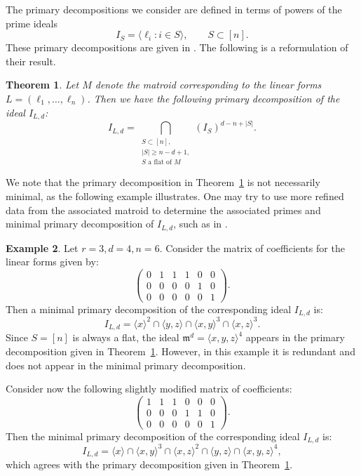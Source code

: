 \documentclass [a4paper,reqno, 11pt]{amsart}
\theoremstyle{plain}
\newtheorem{theorem}{Theorem}[section]
\theoremstyle{plain}
\theoremstyle{plain}
\theoremstyle{plain}
\theoremstyle{definition}
\theoremstyle{definition}
\newtheorem{example}[theorem]{Example}
\theoremstyle{definition}
\theoremstyle{definition}
\theoremstyle{definition}
\theoremstyle{definition}
\begin{document}
The primary decompositions we consider are defined in terms of powers of the prime ideals
\[I_S=\langle\ell_i:i\in S\rangle,\qquad S\subset[n].\]
These primary decompositions are given in \cite[Theorem 2.2]{BTX}. The following is a reformulation of their result.

\begin{theorem}\label{thm:flats-pri-decomp}
    Let $M$ denote the matroid corresponding to the linear forms $L=(\ell_1,\ldots,\ell_n)$. Then we have the following primary decomposition of the ideal $I_{L,d}$:
    \[I_{L,d}=\bigcap_{\substack{S\subset[n],\\ |S|\geq n-d+1, \\ \text{$S$ a flat of $M$}}}(I_S)^{d-n+|S|}.\]
\end{theorem}




We note that the primary decomposition in Theorem~\ref{thm:flats-pri-decomp} is not necessarily minimal, as the following example illustrates. One may try to use more refined data from the associated matroid to determine the associated primes and minimal primary decomposition of $I_{L,d}$, such as in \cite[Theorem 3.2]{CT}.

\begin{example}
    Let $r=3,d=4,n=6$. Consider the matrix of coefficients for the linear forms given by:
        \[\begin{pmatrix}0 & 1 & 1 & 1 & 0 & 0 \\
        0 & 0 & 0 & 0 & 1 & 0 \\
        0 & 0 & 0 & 0 & 0 & 1\end{pmatrix}.\]
        Then a minimal primary decomposition of the corresponding ideal $I_{L,d}$ is:
        \[I_{L,d}= \langle x\rangle^2\cap\langle y,z\rangle\cap\langle x,y\rangle^3\cap\langle x,z\rangle^3.\]
    Since $S=[n]$ is always a flat, the ideal $\mathfrak{m}^d=\langle x,y,z\rangle^4$ appears in the primary decomposition given in Theorem~\ref{thm:flats-pri-decomp}. However, in this example it is redundant and does not appear in the minimal primary decomposition.
    
    Consider now the following slightly modified matrix of coefficients:
        \[\begin{pmatrix}
            1 & 1 & 1 & 0 & 0 & 0\\
            0 & 0 & 0 & 1 & 1 & 0\\
            0 & 0 & 0 & 0 & 0 & 1
        \end{pmatrix}.\]
        Then the minimal primary decomposition of the corresponding ideal $I_{L,d}$ is:
        \[I_{L,d} = \langle x\rangle\cap\langle x,y\rangle^3\cap\langle x,z\rangle^2\cap\langle y,z\rangle\cap\langle x,y,z\rangle^4,\]
        which agrees with the primary decomposition given in Theorem~\ref{thm:flats-pri-decomp}.
\end{example}
\end{document}
